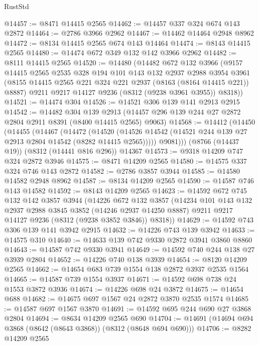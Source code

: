 \begin{lexlean}{RustStd}
\begin{coremodule}
@14457 := @8471 @14415 @2565
@14462 := @14457 @337 @324 @674 @143 @2872
@14464 := @2786 @3966 @2962
@14467 := @14462 @14464 @2948 @8962
@14472 := @8134 @14415 @2565 @674 @143 @14464
@14474 := @8143 @14415 @2565
@14480 := @14474 @672 @349 @132 @142 @3966 @2962
@14482 := @8111 @14415 @2565
@14520 := @14480
    (@14482
      @672
      @132
      @3966
      (@9157
        @14415
        @2565
        @2535
        @328
        @194
        @101
        @143
        @132
        @2937
        @2988
        @3954
        @3961
        (@8155 @14415 @2565 @221 @324 @221 @2937 (@8163 (@8164 @14415 @221)) @8887)
        @9211
        @9217
        @14127
        @9236
        (@8312 (@9238 @3961 @3955))
        @8318))
@14521 := @14474 @304
@14526 := @14521 @306 @139 @141 @2913 @2915
@14542 := @14482
    @304
    @139
    @2913
    (@14457 @296 @139 @244 @27 @2872 @2804 @2911 @8391 (@8400 @14415 @2565) @9063)
@14568 := @14412
    (@14450
      (@14455
        (@14467
          (@14472
            (@14520 (@14526 @14542 (@14521 @244 @139 @27 @2913 @2804 @14542 (@8282 @14415 @2565)))))
          @9081)))
    (@8766 (@14437 @19))
    (@8312 (@14441 @816 @296))
    @14367
@14573 := @9318 @14209 @747 @324 @2872 @3946
@14575 := @8471 @14209 @2565
@14580 := @14575 @337 @324 @746 @143 @2872
@14582 := @2786 @3857 @3944
@14585 := @14580 @14582 @2948 @8962
@14587 := @8134 @14209 @2565
@14590 := @14587 @746 @143 @14582
@14592 := @8143 @14209 @2565
@14623 := @14592
    @672
    @745
    @132
    @142
    @3857
    @3944
    (@14226
      @672
      @132
      @3857
      (@14234
        @101
        @143
        @132
        @2937
        @2988
        @3845
        @3852
        (@14246 @2937 @14250 @8887)
        @9211
        @9217
        @14127
        @9236
        (@8312 (@9238 @3852 @3846))
        @8318))
@14629 := @14592 @743 @306 @139 @141 @3942 @2915
@14632 := @14226 @743 @139 @3942
@14633 := @14575 @310
@14640 := @14633 @139 @742 @9330 @2872 @3941 @3860 @8860
@14643 := @14587 @742 @9330 @3941
@14649 := @14592 @740 @244 @138 @27 @3939 @2804
@14652 := @14226 @740 @138 @3939
@14654 := @8120 @14209 @2565
@14662 := @14654 @683 @739 @1554 @138 @2872 @3937 @2535 @1564
@14665 := @14587 @739 @1554 @3937
@14671 := @14592 @698 @738 @24 @1553 @3872 @3936
@14674 := @14226 @698 @24 @3872
@14675 := @14654 @688
@14682 := @14675 @697 @1567 @24 @2872 @3870 @2535 @1574
@14685 := @14587 @697 @1567 @3870
@14691 := @14592 @695 @244 @690 @27 @3868 @2804
@14694 := @8634 @14209 @2565 @690
@14704 := @14691 (@14694 @694 @3868 (@8642 (@8643 @3868)) (@8312 (@8648 @694 @690)))
@14706 := @8282 @14209 @2565

\end{coremodule}
\end{lexlean}
